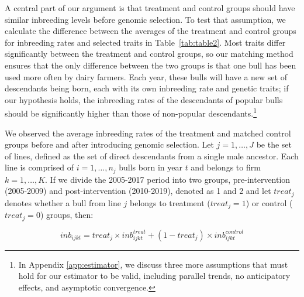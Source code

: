 \documentclass[12pt,letterpaper]{article}
\begin{document}
A central part of our argument is that treatment and control groups should have similar inbreeding levels before genomic selection. To test that assumption, we calculate the difference between the averages of the treatment and control groups for inbreeding rates and selected traits in Table~\ref{tab:table2}. Most traits differ significantly between the treatment and control groups, so our matching method ensures that the only difference between the two groups is that one bull has been used more often by dairy farmers. Each year, these bulls will have a new set of descendants being born, each with its own inbreeding rate and genetic traits; if our hypothesis holds, the inbreeding rates of the descendants of popular bulls should be significantly higher than those of non-popular descendants.\footnote{In Appendix \ref{app:estimator}, we discuss three more assumptions that must hold for our estimator to be valid, including parallel trends, no anticipatory effects, and asymptotic convergence.} 



We observed the average inbreeding rates of the treatment and matched control groups before and after introducing genomic selection.  Let $j=1,\dots, J$ be the set of lines, defined as the set of direct descendants from a single male ancestor. Each line is comprised of $i=1,\dots,n_{j}$ bulls born in year $t$ and belongs to firm $k=1,\dots, K$. If we divide the 2005-2017 period into two groups, pre-intervention (2005-2009) and post-intervention (2010-2019), denoted as 1 and 2 and let $treat_{j}$ denotes whether a bull from line $j$ belongs to treatment ($treat_{j}=1$) or control ($treat_{j}=0$) groups, then:

\begin{equation*}
    inb_{ijkt}=treat_{j}\times inb_{ijkt}^{treat}+(1-treat_{j})\times inb_{ijkt}^{control}
\end{equation*}
\end{document}
